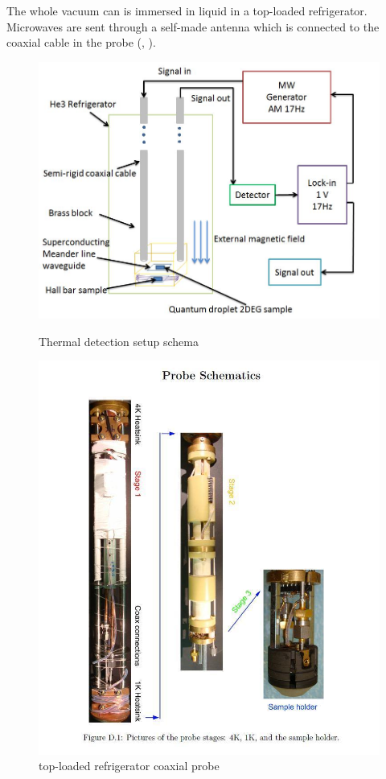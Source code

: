 \documentclass[12pt]{ruthesis}
\begin{document}
The whole vacuum can is immersed in liquid  in a top-loaded refrigerator.
Microwaves are sent through a self-made antenna which is connected to the coaxial cable in the probe (, )\cite{KrisThesis}.
 

\begin{figure}[!htb]\centering
   \begin{minipage}{0.49\textwidth}
     \includegraphics[width=\linewidth]{figures/SCHEMA.JPG}
     \caption{Thermal detection setup schema}\label{thermal-schema}
   \end{minipage}
   \begin {minipage}{0.49\textwidth}
     \includegraphics[width=\linewidth]{figures/probe.JPG}
     \caption{ top-loaded refrigerator coaxial probe}\label{probe}
   \end{minipage}
\end{figure}
\end{document}
